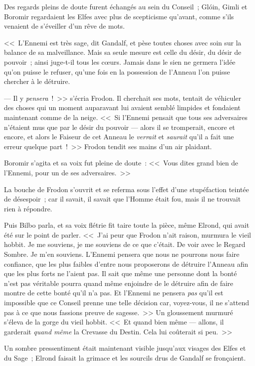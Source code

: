 Des regards pleins de doute furent échangés au sein du Conseil~; Glóin, Gimli et Boromir regardaient les Elfes avec plus de scepticisme qu'avant, comme s'ils venaient de s'éveiller d'un rêve de mots.

<<~L'Ennemi est très sage, dit Gandalf, et pèse toutes choses avec soin sur la balance de sa malveillance. Mais sa seule mesure est celle du désir, du désir de pouvoir~; ainsi juge-t-il tous les cœurs. Jamais dans le sien ne germera l'idée qu'on puisse le refuser, qu'une fois en la possession de l'Anneau l'on puisse chercher à le détruire.

--- Il y \emph{pensera}~!~>> s'écria Frodon. Il cherchait ses mots, tentait de véhiculer des choses qui un moment auparavant lui avaient semblé limpides et fondaient maintenant comme de la neige. <<~Si l'Ennemi pensait que tous ses adversaires n'étaient mus que par le désir du pouvoir — alors il se tromperait, encore et encore, et alors le Faiseur de cet Anneau le \emph{verrait} et \emph{saurait} qu'il a fait une erreur quelque part~!~>> Frodon tendit ses mains d'un air plaidant.

Boromir s'agita et sa voix fut pleine de doute~: <<~Vous dites grand bien de l'Ennemi, pour un de ses adversaires.~>>

La bouche de Frodon s'ouvrit et se referma sous l'effet d'une stupéfaction teintée de désespoir~; car il savait, il savait que l'Homme était fou, mais il ne trouvait rien à répondre.

Puis Bilbo parla, et sa voix flétrie fit taire toute la pièce, même Elrond, qui avait été sur le point de parler. <<~J'ai peur que Frodon n'ait raison, murmura le vieil hobbit. Je me souviens, je me souviens de ce que c'était. De voir avec le Regard Sombre. Je m'en souviens. L'Ennemi pensera que nous ne pourrons nous faire confiance, que les plus faibles d'entre nous proposerons de détruire l'Anneau afin que les plus forts ne l'aient pas. Il sait que même une personne dont la bonté n'est pas véritable pourra quand même enjoindre de le détruire afin de faire montre de cette bonté qu'il n'a pas. Et l'Ennemi ne pensera \emph{pas} qu'il est impossible que ce Conseil prenne une telle décision car, voyez-vous, il ne s'attend pas à ce que nous fassions preuve de sagesse.~>> Un gloussement murmuré s'éleva de la gorge du vieil hobbit. <<~Et quand bien même — allons, il garderait \emph{quand même} la Crevasse du Destin. Cela lui coûterait si peu.~>>

Un sombre pressentiment était maintenant visible jusqu'aux visages des Elfes et du Sage~; Elrond faisait la grimace et les sourcils drus de Gandalf se fronçaient.

